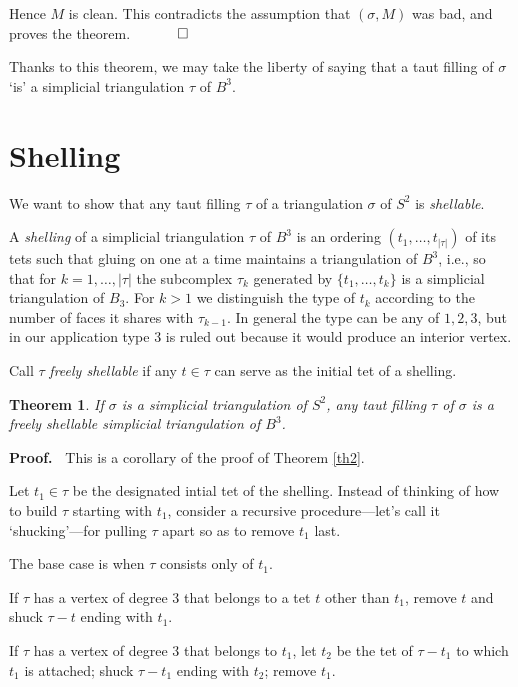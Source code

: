 \documentclass[12pt]{article}
\newtheorem{theorem}{Theorem}
\newcommand{\proofstart}{{\noindent \bf Proof.\ }}
\newcommand{\proofend}{$\quad \qed$}
\begin{document}
Hence $M$ is clean.  This contradicts the assumption that $(\sigma,M)$ was
bad, and proves the theorem.
\proofend

Thanks to this theorem, we may take the liberty of saying that
a taut filling of $\sigma$ `is' a simplicial triangulation
$\tau$ of $B^3$.

\section{Shelling}

We want to show that any taut filling $\tau$ of a triangulation $\sigma$
of $S^2$ is \emph{shellable}.

A \emph{shelling} of a simplicial triangulation $\tau$ of $B^3$
is an ordering 
$(t_1,\ldots,t_{|\tau|})$
of its tets such that
gluing on one at a time maintains a triangulation of $B^3$,
i.e., 
so that for $k=1,\ldots,|\tau|$ the subcomplex $\tau_k$ generated
by $\{t_1,\ldots,t_k\}$ is a simplicial triangulation of $B_3$.
For $k>1$ we distinguish the type of $t_k$ according to the number of
faces it shares with $\tau_{k-1}$.
In general the type can be any of $1,2,3$, but in our application
type $3$ is ruled out because it would produce an interior vertex.

Call $\tau$ \emph{freely shellable} if any $t \in \tau$
can serve as the initial tet of a shelling.

\begin{theorem} \label{th3}
If $\sigma$ is a simplicial triangulation of $S^2$,
any taut filling $\tau$ of $\sigma$
is a freely shellable
simplicial triangulation of $B^3$.
\end{theorem}

\proofstart
This is a corollary of the proof of Theorem \ref{th2}.

Let $t_1 \in \tau$ be the designated intial tet of the shelling.
Instead of thinking of how to build $\tau$ starting with $t_1$,
consider a recursive procedure---let's call it `shucking'---for
pulling $\tau$ apart so as to remove $t_1$ last.

The base case is when $\tau$ consists only of $t_1$.

If $\tau$ has a vertex of degree 3 that belongs to a tet $t$
other than $t_1$, remove $t$ and shuck $\tau-t$ ending with $t_1$.

If $\tau$ has a vertex of degree 3 that belongs to $t_1$,
let $t_2$ be the tet of $\tau-t_1$ to which $t_1$ is attached;
shuck $\tau-t_1$ ending with $t_2$;
remove $t_1$.
\end{document}
